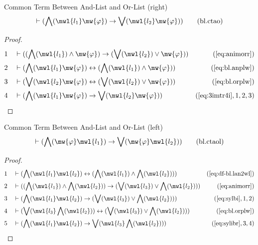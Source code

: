 \begin{lemma} {Common Term Between And-List and Or-List}
(right)
\begin{align}
\vdash ( \bigwedge( \mwl{l_1} \mw{\varphi} ) \rightarrow \bigvee( \mwl{l_2}
    \mw{\varphi} ) )\label{eq:bl.ctao}\tag{bl.ctao}
\end{align}
\end{lemma}


\begin{proof}
\begin{align}
  1 &&  & \vdash ( ( \bigwedge( \mwl{l_1} ) \wedge \mw{\varphi} ) \rightarrow (
     \bigvee( \mwl{l_2} ) \vee \mw{\varphi} )
     )&(\mbox{\ref{eq:animorr}})\notag
  \\ 2 &&  & \vdash ( \bigwedge( \mwl{l_1} \mw{\varphi} ) \leftrightarrow (
     \bigwedge( \mwl{l_1} ) \wedge \mw{\varphi} )
     )&(\mbox{\ref{eq:bl.anplw}})\notag
  \\ 3 &&  & \vdash ( \bigvee( \mwl{l_2} \mw{\varphi} ) \leftrightarrow (
     \bigvee( \mwl{l_2} ) \vee \mw{\varphi} )
     )&(\mbox{\ref{eq:bl.orplw}})\notag
  \\ 4 &&  & \vdash ( \bigwedge( \mwl{l_1} \mw{\varphi} ) \rightarrow \bigvee(
     \mwl{l_2} \mw{\varphi} )
     )&(\mbox{\ref{eq:3imtr4i}},1,2,3)\notag
\end{align}
\end{proof}

\begin{lemma} {Common Term Between And-List and Or-List
(left)}
\begin{align}
\vdash ( \bigwedge( \mw{\varphi} \mwl{l_1} ) \rightarrow \bigvee( \mw{\varphi}
    \mwl{l_2} ) )\label{eq:bl.ctaol}\tag{bl.ctaol}
\end{align}
\end{lemma}


\begin{proof}
\begin{align}
  1 &&  & \vdash ( \bigwedge( \mwl{l_1} \mwl{l_2} ) \leftrightarrow (
     \bigwedge( \mwl{l_1} ) \wedge \bigwedge( \mwl{l_2} )
     ) )&(\mbox{\ref{eq:df-bl.lan2wl}})\notag
  \\ 2 &&  & \vdash ( ( \bigwedge( \mwl{l_1} ) \wedge \bigwedge( \mwl{l_2} ) )
     \rightarrow ( \bigvee( \mwl{l_3} ) \vee \bigwedge(
     \mwl{l_2} ) ) )&(\mbox{\ref{eq:animorr}})\notag
  \\ 3 &&  & \vdash ( \bigwedge( \mwl{l_1} \mwl{l_2} ) \rightarrow ( \bigvee(
     \mwl{l_3} ) \vee \bigwedge( \mwl{l_2} ) )
     )&(\mbox{\ref{eq:sylbi}},1,2)\notag
  \\ 4 &&  & \vdash ( \bigvee( \mwl{l_3} \bigwedge( \mwl{l_2} ) )
     \leftrightarrow ( \bigvee( \mwl{l_3} ) \vee
     \bigwedge( \mwl{l_2} ) )
     )&(\mbox{\ref{eq:bl.orplw}})\notag
  \\ 5 &&  & \vdash ( \bigwedge( \mwl{l_1} \mwl{l_2} ) \rightarrow \bigvee(
     \mwl{l_3} \bigwedge( \mwl{l_2} ) )
     )&(\mbox{\ref{eq:sylibr}},3,4)\notag
\end{align}
\end{proof}


